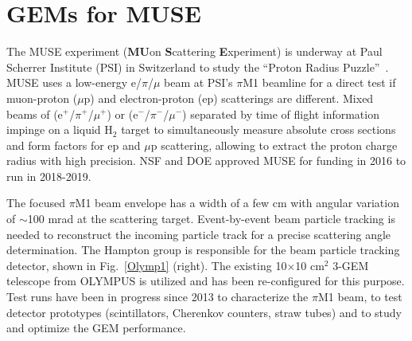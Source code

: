 \documentclass{PoS}
\begin{document}
\section{GEMs for MUSE}

The MUSE experiment ({\bf{MU}}on {\bf{S}}cattering {\bf{E}}xperiment) is
underway at Paul Scherrer Institute (PSI) in Switzerland to study the
``Proton Radius Puzzle''~\cite{MUSE_proposal, MUSE_tdr}.
MUSE uses a low-energy e/$\pi$/$\mu$ beam at PSI's $\pi$M1 beamline
for a direct test if muon-proton ($\mu$p) and electron-proton (ep) scatterings
are different.  Mixed beams of (e$^+$/$\pi^+$/$\mu^+$) or
(e$^-$/$\pi^-$/$\mu^-$) separated by time of flight information
impinge on a liquid H$_2$ target to simultaneously measure absolute cross
sections and form factors for ep and $\mu$p scattering, allowing to extract the
proton charge radius with high precision. 
NSF and DOE approved MUSE for funding in 2016 to run in 2018-2019.


The focused $\pi$M1 beam envelope has a width of a few cm with angular
variation of $\sim$100 mrad at the scattering target. Event-by-event beam
particle tracking is needed to reconstruct the incoming particle track for
a precise scattering angle determination. The Hampton group is responsible
for the beam particle tracking detector, shown in Fig.~\ref{Olymp1} (right).
The existing 10$\times$10 cm$^2$ 3-GEM telescope from OLYMPUS is utilized and
has been re-configured for this purpose.
Test runs have been in progress since 2013
to characterize the $\pi$M1 beam, to test detector prototypes (scintillators,
Cherenkov counters, straw tubes) and to study and optimize the GEM performance.
\end{document}
